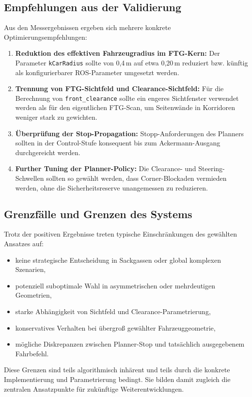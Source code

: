 \subsection{Empfehlungen aus der Validierung}

Aus den Messergebnissen ergeben sich mehrere konkrete Optimierungsempfehlungen:

\begin{enumerate}
    \item \textbf{Reduktion des effektiven Fahrzeugradius im FTG-Kern:} Der Parameter \texttt{kCarRadius} sollte von 0{,}4\,m auf etwa 0{,}20\,m reduziert bzw. künftig als konfigurierbarer ROS-Parameter umgesetzt werden.
    \item \textbf{Trennung von FTG-Sichtfeld und Clearance-Sichtfeld:} Für die Berechnung von \texttt{front\_clearance} sollte ein engeres Sichtfenster verwendet werden als für den eigentlichen FTG-Scan, um Seitenwände in Korridoren weniger stark zu gewichten.
    \item \textbf{Überprüfung der Stop-Propagation:} Stopp-Anforderungen des Planners sollten in der Control-Stufe konsequent bis zum Ackermann-Ausgang durchgereicht werden.
    \item \textbf{Further Tuning der Planner-Policy:} Die Clearance- und Steering-Schwellen sollten so gewählt werden, dass Corner-Blockaden vermieden werden, ohne die Sicherheitsreserve unangemessen zu reduzieren.
\end{enumerate}

\subsection{Grenzfälle und Grenzen des Systems}

Trotz der positiven Ergebnisse treten typische Einschränkungen des gewählten Ansatzes auf:

\begin{itemize}
    \item keine strategische Entscheidung in Sackgassen oder global komplexen Szenarien,
    \item potenziell suboptimale Wahl in asymmetrischen oder mehrdeutigen Geometrien,
    \item starke Abhängigkeit von Sichtfeld und Clearance-Parametrierung,
    \item konservatives Verhalten bei übergroß gewählter Fahrzeuggeometrie,
    \item mögliche Diskrepanzen zwischen Planner-Stop und tatsächlich ausgegebenem Fahrbefehl.
\end{itemize}

Diese Grenzen sind teils algorithmisch inhärent und teils durch die konkrete Implementierung und Parametrierung bedingt. Sie bilden damit zugleich die zentralen Ansatzpunkte für zukünftige Weiterentwicklungen.

